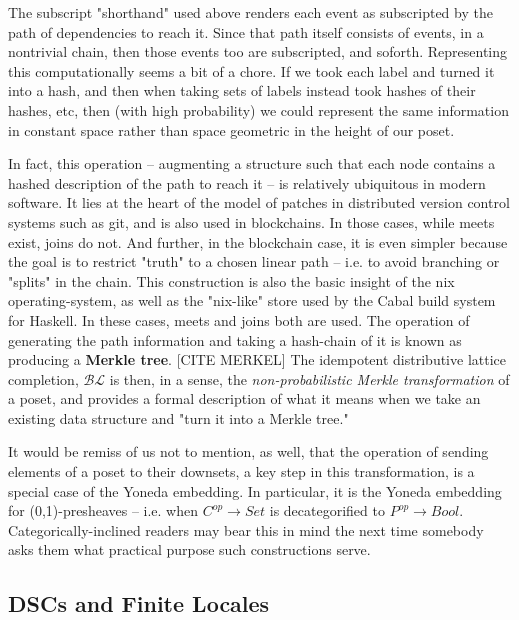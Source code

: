 \documentclass[hoptionsi,review,format=acmsmall]{acmart}
\theoremstyle{definition}
\newcommand{\BLc}{\mathcal{BL}}
\begin{document}
The subscript "shorthand" used above renders each event as subscripted by the path of dependencies to reach it. Since that path itself consists of events, in a nontrivial chain, then those events too are subscripted, and soforth. Representing this computationally seems a bit of a chore. If we took each label and turned it into a hash, and then when taking sets of labels instead took hashes of their hashes, etc, then (with high probability) we could represent the same information in constant space rather than space geometric in the height of our poset.

In fact, this operation -- augmenting a structure such that each node contains a hashed description of the path to reach it -- is relatively ubiquitous in modern software. It lies at the heart of the model of patches in distributed version control systems such as git, and is also used in blockchains. In those cases, while meets exist, joins do not. And further, in the blockchain case, it is even simpler because the goal is to restrict "truth" to a chosen linear path -- i.e. to avoid branching or "splits" in the chain. This construction is also the basic insight of the nix operating-system, as well as the "nix-like" store used by the Cabal build system for Haskell. In these cases, meets and joins both are used. The operation of generating the path information and taking a hash-chain of it is known as producing a \textbf{Merkle tree}. [CITE MERKEL] The idempotent distributive lattice completion, \(\BLc\) is then, in a sense, the \textit{non-probabilistic Merkle transformation} of a poset, and provides a formal description of what it means when we take an existing data structure and "turn it into a Merkle tree."

It would be remiss of us not to mention, as well, that the operation of sending elements of a poset to their downsets, a key step in this transformation, is a special case of the Yoneda embedding. In particular, it is the Yoneda embedding for (0,1)-presheaves -- i.e. when \(C^{op} \rightarrow Set\) is decategorified to \(P^{op} \rightarrow Bool\). Categorically-inclined readers may bear this in mind the next time somebody asks them what practical purpose such constructions serve.


\subsection{DSCs and Finite Locales}
\end{document}
